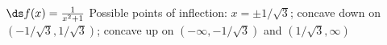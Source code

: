 {$\ds f(x) = \frac{1}{x^2+1}$
}
{Possible points of inflection: $x=\pm1/\sqrt{3}$;
concave down on $(-1/\sqrt{3},1/\sqrt{3})$;
concave up on $(-\infty,-1/\sqrt{3})$ and $(1/\sqrt{3},\infty)$
}
